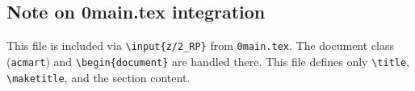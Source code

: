 \subsection*{Note on 0main.tex integration}

This file is included via \texttt{\textbackslash input\{z/2\_RP\}} from
\texttt{0main.tex}. The document class (\texttt{acmart}) and
\texttt{\textbackslash begin\{document\}} are handled there. This file
defines only \texttt{\textbackslash title}, \texttt{\textbackslash maketitle},
and the section content.

